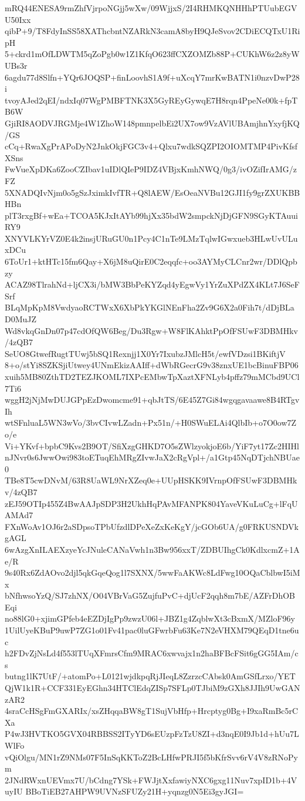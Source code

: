 mRQ44ENESA9rmZhfVjrpoNGjj5wXw/09WjjxS/2I4RHMKQNHHhPTUubEGVU50Ixx
qibP+9/T8FdyInSS58XAThcbntNZARkN3camA8byH9QJeSvov2CDiECQTxU1RipH
5+ckrd1mOfLDWTM5qZoPgb0w1Z1KfqO623ffCXZOMZb88P+CUKhW6z2z8yWUBs3r
6agdu77d8Slfn+YQr6JOQSP+finLoovhS1A9f+uXcqY7mrKwBATN1i0nzvDwP28i
tvoyAJed2qEI/ndxIq07WgPMBFTNK3X5GyREyGywqE7H8rqn4PpeNe00k+fpTB6W
GjiRI8AODVJRGMje4W1ZhoW148pmnpelbEi2UX7ow9VzAVlUBAmjhnYxyfjKQ/GS
cCq+RwaXgPrAPoDyN2JnkOkjFGC3v4+Qlxu7wdkSQZPI2OIOMTMP4PivKfsfXSns
FwVueXpDKa6ZooCZIbav1uIDlQIeP9IDZ4VBjxKmhNWQ/0g3/ivOZifIrAMG/zFZ
5XNADQIvNjm0o5gSzJximkIvfTR+Q8lAEW/EsOeaNVBu12GJI1fy9grZXUKBBHBn
plT3rxgBf+wEa+TCOA5KJxItAYb99hjXx35bdW2smpckNjDjGFN9SGyKTAuuiRY9
XNYVLKYrVZ0E4k2insjURuGU0n1Pcy4C1nTe9LMzTqlwIGwxueb3HLwUvULuxDCu
6ToUr1+ktHTc15fm6Qay+X6jM8uQirE0C2eqqfc+oo3AYMyCLCnr2wr/DDlQpbzy
ACAZ98TlrahNd+ljCX3i/bMW3BbPeKYZqd4yEgwVy1YrZuXPdZX4KLt7J6SeFSrf
BLqMpKpM8VwdyaoRCTWxX6XbPkYKGlNEnFha2Zv9G6X2a0Fih7t/dDjBLaD0MuJZ
Wd8vkqGnDn07p47cdOfQW6Beg/Du3Rgw+W8FlKAhktPpOfFSUwF3DBMHkv/4zQB7
SeUO8GtwefRugtTUwj5bSQ1Rexnjj1X0Yr7IxubzJMlcH5t/ewfVDzsi1BKiftjV
8+o/stYi8SZKSjiUtwey4UNmEkizAAIff+dWbRGecrG9v38znxUE1bcBinuFBP06
xuih5MB80ZthTD2TEZJKOML7IXPcEMbwTpXaztXFNLyb4pffz79mMCbd9UCl7Ti6
wggH2jNjMwDUJGPpEzDwomcme91+qbJtTS/6E45Z7Gi84wgqgavaawe8B4RTgvIh
wtSFnluaL5WN3wVo/3bvCIvwLZadn+Px51n/+H0SWuELAi4QlbIb+o7O0ow7Zo/e
Vi+YKvf+bpbC9Kvs2B9OT/SfiXzgGHKD7O5sZWlzyokjoE6b/YiF7yt17Zc2HIHl
nJNvr0s6JwwOwi983toETuqEhMRgZIvwJaX2cRgVpl+/a1Gtp45NqDTjchNBUae0
TBe8T5cwDNvM/63R8UaWL9NrXZeq0e+UUpHSKK9IVrnpOfFSUwF3DBMHkv/4zQB7
zEJ59OTIp455Z4BwAAJpSDP3H2UkhHqPAvMFANPK804YaveVKuLuCg+lFqUAMAd7
FXnWoAv1OJ6r2aSDpsoTPbUfzdlDPeXeZxKeKgY/jcGOb6UA/g0FRKUSNDVkgAGL
6wAzgXnILAEXzyeYcJNuleCANaVwh1n3Bw956xxT/ZDBUIhgCk0KdlxcmZ+1Ae/R
9s40Rx6ZdAOvo2djl5qkGqeQog1l7SXNX/5wwFaAKWc8LdFwg10OQaCblbwI5iMx
bNfhwsoYzQ/SJ7zhNX/O04VBrVaG5ZujfuPvC+djUcF2qqh8m7bE/AZFrDhOBEqi
no88lG0+xjimGPfeb4eEZDjIgPp9zwzU06l+JBZ1g4ZqblwXt3cBxmX/MZloF96y
1UilUyeKBuP9uwP7ZG1o01Fv41pac0luGFwrbFu63Ke7N2eVHXM79QEqD1tne6uc
h2FDvZjNsLd4f553lTUqXFmrsCfm9MRAC6xwvajx1n2haBFBcFSit6gGG5IAm/cs
butng1lK7UtF/+atomPo+L0121wjdkpqRjJIeqL8ZzrzcCAbsk0AmGSfLrxo/YET
QjW1k1R+CCF331EyEGhn34HTClEdqZISp7SFLp0TJbiM9zGXh8JJIh9UwGANzAR2
4sraCcHSgFmGXARIx/xsZHqqaBW8gT1SujVbHfp+Hrcptyg0Bg+I9xaRmBc5rCXa
P4wJ3HVTKO5GVX04RBBSS2ITyYD6sEUzpFzTzU8ZI+d3nqE0I9Jb1d+hUu7LWlFo
vQiOlgu/MN1rZ9NMs07F5InSqKKToZ2BcLHfwPRJI5f5bKfrSvv6rV4V8zRNoPym
2JNdRWxnUEVmx7U/bCdng7YSk+FWJjtXxfawiyNXC6gxg11Nuv7xpID1b+4VuyIU
BBoTiEB27AHPW9UVNzSFUZy21H+yqnzg0N5Ei3gyJGI=
